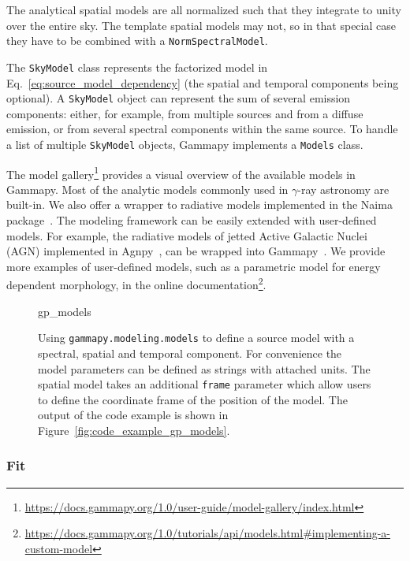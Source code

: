 \documentclass[longauth]{aa}
\newcommand{\code}[1]{\texttt{#1}}
\newcommand{\gammapy}{Gammapy\xspace}
\newcommand{\agnpy}{Agnpy\xspace}
\newcommand{\gammaray}{$\gamma$-ray\xspace}
\begin{document}
The analytical spatial models are all normalized such that they integrate to
unity over the entire sky. The template spatial models may not, so in that special
case they have to be combined with a \code{NormSpectralModel}.

The \code{SkyModel} class represents the factorized model in Eq.~\ref{eq:source_model_dependency}
(the spatial and temporal components being optional).
A \code{SkyModel} object can represent the sum of several emission components:
either, for example, from multiple sources and from a diffuse emission, or from several spectral
components within the same source. To handle a list of multiple \code{SkyModel} objects, \gammapy
implements a \code{Models} class.

The model gallery\footnote{\url{https://docs.gammapy.org/1.0/user-guide/model-gallery/index.html}}
 provides a visual overview of the available models in
\gammapy. Most of the analytic models commonly used in \gammaray astronomy are
built-in. We also offer a wrapper to radiative models implemented in the Naima
package~\citep{naima}. The modeling framework can be easily extended with
user-defined models. For example, the radiative models of jetted Active Galactic Nuclei (AGN)
implemented in \agnpy~\citep{agnpy2022}, can be wrapped into 
\gammapy~\citep[see Section 3.5 of ][]{2022A&A...660A..18N}. We provide 
more examples of user-defined models, such as a parametric model for energy dependent morphology,
in the online documentation\footnote{\url{https://docs.gammapy.org/1.0/tutorials/api/models.html\#implementing-a-custom-model}}.


\begin{figure}
        \small
        {gp_models}
        \caption{Using \code{gammapy.modeling.models} to define a source model with a
    spectral, spatial and temporal component. For convenience the model
    parameters can be defined as strings with attached units. The spatial model
    takes an additional \code{frame} parameter which allow users to define
    the coordinate frame of the position of the model. The output
        of the code example is shown in Figure~\ref{fig:code_example_gp_models}.
    }
        \label{fig*:minted:gp_models}
\end{figure}

\subsubsection{Fit}
\label{sssec:fit}
\end{document}
